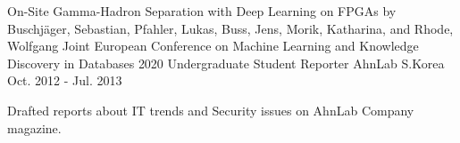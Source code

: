 

\begin{cventries}

  \cventry
    {On-Site Gamma-Hadron Separation with Deep Learning on FPGAs by Buschjäger, Sebastian, Pfahler, Lukas, Buss, Jens, Morik, Katharina, and Rhode, Wolfgang } %
    {} %
    {Joint European Conference on Machine Learning and Knowledge Discovery in Databases} %
    {2020} %
    {}
  \cventry
    {Undergraduate Student Reporter} %
    {AhnLab} %
    {S.Korea} %
    {Oct. 2012 - Jul. 2013} %
    {
      \begin{cvitems} %
        \item {Drafted reports about IT trends and Security issues on AhnLab Company magazine.}
      \end{cvitems}
    }

\end{cventries}
